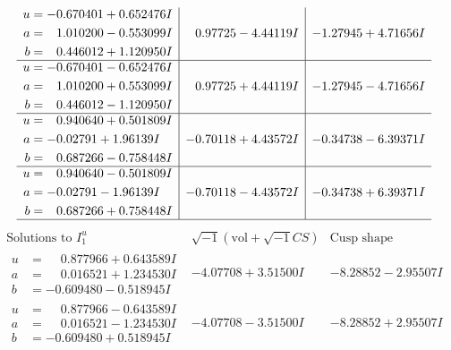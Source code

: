 \documentclass[1p]{elsarticle_modified}
\theoremstyle{definition}
\newcommand{\I}{\sqrt{-1}}
\begin{document}
$$\begin{array}{c|c|c}
\begin{aligned}
u &= -0.670401 + 0.652476 I \\
a &= \phantom{-}1.010200 - 0.553099 I \\
b &= \phantom{-}0.446012 + 1.120950 I\end{aligned}
 & \phantom{-}0.97725 - 4.44119 I & -1.27945 + 4.71656 I \\ \hline\begin{aligned}
u &= -0.670401 - 0.652476 I \\
a &= \phantom{-}1.010200 + 0.553099 I \\
b &= \phantom{-}0.446012 - 1.120950 I\end{aligned}
 & \phantom{-}0.97725 + 4.44119 I & -1.27945 - 4.71656 I \\ \hline\begin{aligned}
u &= \phantom{-}0.940640 + 0.501809 I \\
a &= -0.02791 + 1.96139 I \\
b &= \phantom{-}0.687266 - 0.758448 I\end{aligned}
 & -0.70118 + 4.43572 I & -0.34738 - 6.39371 I \\ \hline\begin{aligned}
u &= \phantom{-}0.940640 - 0.501809 I \\
a &= -0.02791 - 1.96139 I \\
b &= \phantom{-}0.687266 + 0.758448 I\end{aligned}
 & -0.70118 - 4.43572 I & -0.34738 + 6.39371 I\\
 \hline 
 \end{array}$$\newpage$$\begin{array}{c|c|c}  
\text{Solutions to }I^u_{1}& \I (\text{vol} + \sqrt{-1}CS) & \text{Cusp shape}\\
 \hline 
\begin{aligned}
u &= \phantom{-}0.877966 + 0.643589 I \\
a &= \phantom{-}0.016521 + 1.234530 I \\
b &= -0.609480 - 0.518945 I\end{aligned}
 & -4.07708 + 3.51500 I & -8.28852 - 2.95507 I \\ \hline\begin{aligned}
u &= \phantom{-}0.877966 - 0.643589 I \\
a &= \phantom{-}0.016521 - 1.234530 I \\
b &= -0.609480 + 0.518945 I\end{aligned}
 & -4.07708 - 3.51500 I & -8.28852 + 2.95507 I \\ \hline\begin{aligned}

\end{aligned}
\end{array}$$
\end{document}

